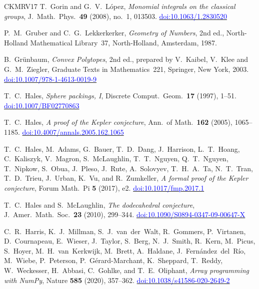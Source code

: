 \documentclass[11pt,reqno]{amsart}
\newcommand{\bluelink}[2]{\href{#1}{\textcolor{blue}{#2}}}
\renewcommand{\_}{\origunderscore\allowbreak}
\numberwithin{equation}{section}
\theoremstyle{plain}
\theoremstyle{definition}
\theoremstyle{remark}
\begin{document}
\begin{thebibliography}{CKMRV17}
T.~Gorin and G.~V.~L\'opez,
\textit{Monomial integrals on the classical groups},
J.\ Math.\ Phys.\ \textbf{49} (2008), no.~1, 013503.
\bluelink{https://doi.org/10.1063/1.2830520}{doi:10.1063/1.2830520}

P.~M.~Gruber and C.~G.~Lekkerkerker,
\textit{Geometry of Numbers}, 2nd ed.,
North-Holland Mathematical Library~37, North-Holland, Amsterdam, 1987.

B.~Gr\"unbaum,
\textit{Convex Polytopes}, 2nd ed., prepared by V.~Kaibel, V.~Klee and
G.~M.~Ziegler,
Graduate Texts in Mathematics~221, Springer, New York, 2003.
\bluelink{https://doi.org/10.1007/978-1-4613-0019-9}{doi:10.1007/978-1-4613-0019-9}

T.~C.~Hales,
\textit{Sphere packings, {I}},
Discrete Comput.\ Geom.\ \textbf{17} (1997), 1--51.
\bluelink{https://doi.org/10.1007/BF02770863}{doi:10.1007/BF02770863}

T.~C.~Hales,
\textit{A proof of the {K}epler conjecture},
Ann.\ of Math.\ \textbf{162} (2005), 1065--1185.
\bluelink{https://doi.org/10.4007/annals.2005.162.1065}{doi:10.4007/annals.2005.162.1065}

T.~C.~Hales, M.~Adams, G.~Bauer, T.~D.~Dang, J.~Harrison, L.~T.~Hoang,
C.~Kaliszyk, V.~Magron, S.~McLaughlin, T.~T.~Nguyen, Q.~T.~Nguyen,
T.~Nipkow, S.~Obua, J.~Pleso, J.~Rute, A.~Solovyev, T.~H.~A.~Ta,
N.~T.~Tran, T.~D.~Trieu, J.~Urban, K.~Vu, and R.~Zumkeller,
\textit{A formal proof of the {K}epler conjecture},
Forum Math.\ Pi \textbf{5} (2017), e2.
\bluelink{https://doi.org/10.1017/fmp.2017.1}{doi:10.1017/fmp.2017.1}

T.~C.~Hales and S.~McLaughlin,
\textit{The dodecahedral conjecture},
J.\ Amer.\ Math.\ Soc.\ \textbf{23} (2010), 299--344.
\bluelink{https://doi.org/10.1090/S0894-0347-09-00647-X}{doi:10.1090/S0894-0347-09-00647-X}

C.~R.~Harris, K.~J.~Millman, S.~J.~van~der~Walt, R.~Gommers,
P.~Virtanen, D.~Cournapeau, E.~Wieser, J.~Taylor, S.~Berg,
N.~J.~Smith, R.~Kern, M.~Picus, S.~Hoyer, M.~H.~van~Kerkwijk,
M.~Brett, A.~Haldane, J.~Fern\'andez~del~R\'io, M.~Wiebe,
P.~Peterson, P.~G\'erard-Marchant, K.~Sheppard, T.~Reddy,
W.~Weckesser, H.~Abbasi, C.~Gohlke, and T.~E.~Oliphant,
\textit{Array programming with {N}um{P}y},
Nature \textbf{585} (2020), 357--362.
\bluelink{https://doi.org/10.1038/s41586-020-2649-2}{doi:10.1038/s41586-020-2649-2}


\end{thebibliography}
\end{document}
